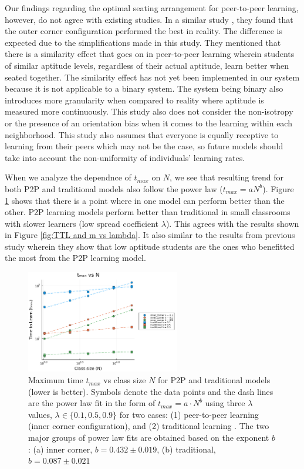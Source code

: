 \documentclass[10pt,a4paper,twoside]{article}
\begin{document}
\noindent Our findings regarding the optimal seating arrangement for peer-to-peer learning, however, do not agree with existing studies. In a similar study \cite{roxas2010seating}, they found that the outer corner configuration performed the best in reality. The difference is expected due to the simplifications made in this study. They mentioned that there is a similarity effect that goes on in peer-to-peer learning wherein students of similar aptitude levels, regardless of their actual aptitude, learn better when seated together. The similarity effect has not yet been implemented in our system because it is not applicable to a binary system. The system being binary also introduces more granularity when compared to reality where aptitude is measured more continuously. This study also does not consider the non-isotropy or the presence of an orientation bias when it comes to the learning within each neighborhood. This study also assumes that everyone is equally receptive to learning from their peers which may not be the case, so future models should take into account the non-uniformity of individuals’ learning rates.


\noindent When we analyze the dependnce of $t_{max}$ on $N$, we see that resulting trend for both P2P and traditional models also follow the power law ($t_{max}=aN^b$). Figure \ref{fig:tmax vs N} shows that there is a point where in one model can perform better than the other. P2P learning models perform better than traditional in small classrooms with slower learners (low spread coefficient $\lambda$). This agrees with the results shown in Figure \ref{fig:TTL and m vs lambda}. It also similar to the results from previous study \cite{roxas2010seating} wherein they show that low aptitude students are the ones who benefitted the most from the P2P learning model.

\begin{figure}[h]
  \centering
  \includegraphics[width=0.6\textwidth]{figures/N_vs_tmax-traditional-inner_corner.png}
  \caption{Maximum time $t_{max}$ vs class size $N$ for P2P and traditional models (lower is better). Symbols denote the data points and the dash lines are the power law fit in the form of $t_{max}=a \cdot N^b$ using three $\lambda$ values, $\lambda \in \lbrace 0.1, 0.5, 0.9 \rbrace$ for two cases: (1) peer-to-peer learning (inner corner configuration), and (2) traditional learning . The two major groups of power law fits are obtained based on the exponent $b$: (a) inner corner, $b = 0.432 \pm 0.019$, (b) traditional, $b=0.087\pm0.021$
  }
  \label{fig:tmax vs N}
\end{figure}
\end{document}

